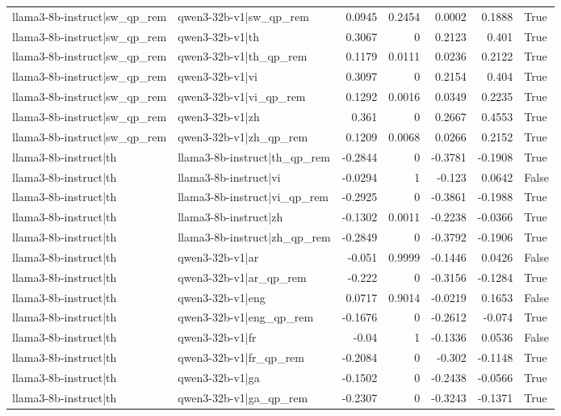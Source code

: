 \begin{table}
\begin{tabular}{l l r r r r l}
llama3-8b-instruct|sw_qp_rem & qwen3-32b-v1|sw_qp_rem & 0.0945 & 0.2454 & 0.0002 & 0.1888 & True \\
llama3-8b-instruct|sw_qp_rem & qwen3-32b-v1|th & 0.3067 & 0 & 0.2123 & 0.401 & True \\
llama3-8b-instruct|sw_qp_rem & qwen3-32b-v1|th_qp_rem & 0.1179 & 0.0111 & 0.0236 & 0.2122 & True \\
llama3-8b-instruct|sw_qp_rem & qwen3-32b-v1|vi & 0.3097 & 0 & 0.2154 & 0.404 & True \\
llama3-8b-instruct|sw_qp_rem & qwen3-32b-v1|vi_qp_rem & 0.1292 & 0.0016 & 0.0349 & 0.2235 & True \\
llama3-8b-instruct|sw_qp_rem & qwen3-32b-v1|zh & 0.361 & 0 & 0.2667 & 0.4553 & True \\
llama3-8b-instruct|sw_qp_rem & qwen3-32b-v1|zh_qp_rem & 0.1209 & 0.0068 & 0.0266 & 0.2152 & True \\
llama3-8b-instruct|th & llama3-8b-instruct|th_qp_rem & -0.2844 & 0 & -0.3781 & -0.1908 & True \\
llama3-8b-instruct|th & llama3-8b-instruct|vi & -0.0294 & 1 & -0.123 & 0.0642 & False \\
llama3-8b-instruct|th & llama3-8b-instruct|vi_qp_rem & -0.2925 & 0 & -0.3861 & -0.1988 & True \\
llama3-8b-instruct|th & llama3-8b-instruct|zh & -0.1302 & 0.0011 & -0.2238 & -0.0366 & True \\
llama3-8b-instruct|th & llama3-8b-instruct|zh_qp_rem & -0.2849 & 0 & -0.3792 & -0.1906 & True \\
llama3-8b-instruct|th & qwen3-32b-v1|ar & -0.051 & 0.9999 & -0.1446 & 0.0426 & False \\
llama3-8b-instruct|th & qwen3-32b-v1|ar_qp_rem & -0.222 & 0 & -0.3156 & -0.1284 & True \\
llama3-8b-instruct|th & qwen3-32b-v1|eng & 0.0717 & 0.9014 & -0.0219 & 0.1653 & False \\
llama3-8b-instruct|th & qwen3-32b-v1|eng_qp_rem & -0.1676 & 0 & -0.2612 & -0.074 & True \\
llama3-8b-instruct|th & qwen3-32b-v1|fr & -0.04 & 1 & -0.1336 & 0.0536 & False \\
llama3-8b-instruct|th & qwen3-32b-v1|fr_qp_rem & -0.2084 & 0 & -0.302 & -0.1148 & True \\
llama3-8b-instruct|th & qwen3-32b-v1|ga & -0.1502 & 0 & -0.2438 & -0.0566 & True \\
llama3-8b-instruct|th & qwen3-32b-v1|ga_qp_rem & -0.2307 & 0 & -0.3243 & -0.1371 & True \\

\end{tabular}
\end{table}
